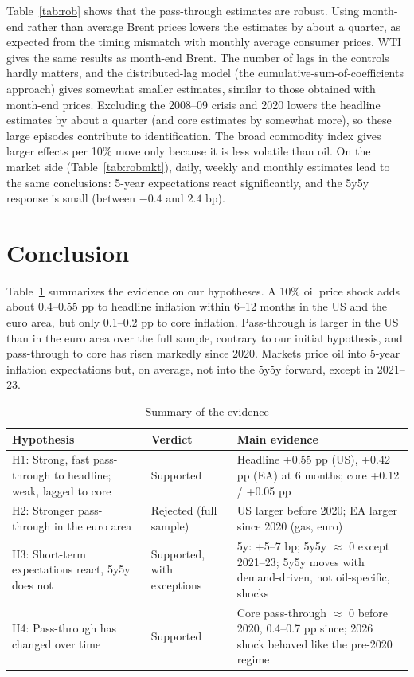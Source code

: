\documentclass[11pt,a4paper]{article}
\begin{document}
Table~\ref{tab:rob} shows that the pass-through estimates are robust. Using month-end rather than average Brent prices lowers the estimates by about a quarter, as expected from the timing mismatch with monthly average consumer prices. WTI gives the same results as month-end Brent. The number of lags in the controls hardly matters, and the distributed-lag model (the cumulative-sum-of-coefficients approach) gives somewhat smaller estimates, similar to those obtained with month-end prices. Excluding the 2008--09 crisis and 2020 lowers the headline estimates by about a quarter (and core estimates by somewhat more), so these large episodes contribute to identification. The broad commodity index gives larger effects per 10\% move only because it is less volatile than oil. On the market side (Table~\ref{tab:robmkt}), daily, weekly and monthly estimates lead to the same conclusions: 5-year expectations react significantly, and the 5y5y response is small (between $-0.4$ and $2.4$ bp).

\section{Conclusion}

Table~\ref{tab:hyp} summarizes the evidence on our hypotheses. A 10\% oil price shock adds about 0.4--0.55 pp to headline inflation within 6--12 months in the US and the euro area, but only 0.1--0.2 pp to core inflation. Pass-through is larger in the US than in the euro area over the full sample, contrary to our initial hypothesis, and pass-through to core has risen markedly since 2020. Markets price oil into 5-year inflation expectations but, on average, not into the 5y5y forward, except in 2021--23.

\begin{table}[!htbp]
\centering\small
\caption{Summary of the evidence}\label{tab:hyp}
\begin{tabular}{p{6.2cm}p{1.9cm}p{6.4cm}}
\toprule
Hypothesis & Verdict & Main evidence\\
\midrule
H1: Strong, fast pass-through to headline; weak, lagged to core & Supported & Headline +0.55 pp (US), +0.42 pp (EA) at 6 months; core +0.12 / +0.05 pp\\
H2: Stronger pass-through in the euro area & Rejected (full sample) & US larger before 2020; EA larger since 2020 (gas, euro)\\
H3: Short-term expectations react, 5y5y does not & Supported, with exceptions & 5y: +5--7 bp; 5y5y $\approx$ 0 except 2021--23; 5y5y moves with demand-driven, not oil-specific, shocks\\
H4: Pass-through has changed over time & Supported & Core pass-through $\approx$ 0 before 2020, 0.4--0.7 pp since; 2026 shock behaved like the pre-2020 regime\\
\bottomrule
\end{tabular}
\end{table}
\end{document}
